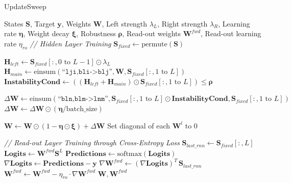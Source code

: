 \documentclass[a4paper,12pt]{report}
\begin{document}
\begin{algorithm}
\caption{UpdateSweep}
\label{alg:training_pass}
\begin{algorithmic}[1]
\scriptsize
\Require States $\mathbf{S}$, Target $\mathbf{y}$, Weights $\mathbf{W}$, 
Left strength $\lambda_{L}$, Right strength $\lambda_{R}$, Learning rate 
$\mathbf{\eta}$, Weight decay $\mathbf{\xi}$, Robustness $\mathbf{\rho}$, 
Read-out weights $\mathbf{W}^{fwd}$, Read-out learning rate 
$\eta_{ro}$
\Statex
\Statex \textit{// Hidden Layer Training}
\State $\mathbf{S}_{fixed} \gets \text{permute}(\mathbf{S})$ 

\State $\mathbf{H}_{left} \gets \mathbf{S}_{fixed}[:, 0 \text{ to } L-1] \odot \lambda_{L}$
\State $\mathbf{H}_{main} \gets \text{einsum}(\texttt{``lji,bli->blj''}, \mathbf{W}, \mathbf{S}_{fixed}[:, 1 \text{ to } L])$
\State $\mathbf{InstabilityCond} \gets ((\mathbf{H}_{left} + \mathbf{H}_{main}) \odot \mathbf{S}_{fixed}[:, 1 \text{ to } L]) \le \mathbf{\rho}$ 

\State $\Delta\mathbf{W} \gets \text{einsum}(\texttt{``bln,blm->lnm''}, \mathbf{S}_{fixed}[:, 1 \text{ to } L] \odot \mathbf{InstabilityCond}, \mathbf{S}_{fixed}[:, 1 \text{ to } L])$
\State $\Delta\mathbf{W} \gets \Delta\mathbf{W} \odot (\mathbf{\eta} / \text{batch\_size})$

\State $\mathbf{W} \gets \mathbf{W} \odot (1 - \mathbf{\eta} \odot \mathbf{\xi}) + \Delta\mathbf{W}$ 
\State Set diagonal of each $\mathbf{W}^l$ to $0$ 

\Statex
\Statex \textit{// Read-out Layer Training through Cross-Entropy Loss}
\State $\mathbf{S}_{last\_rnn} \gets \mathbf{S}_{fixed}[:, L]$
\State $\mathbf{Logits} \gets \mathbf{W}^{fwd} \mathbf{S}^{L}$
\State $\mathbf{Predictions} \gets \text{softmax}(\mathbf{Logits})$
\State $\nabla{\mathbf{Logits}} \gets \mathbf{Predictions} - \mathbf{y}$
\State $\nabla{\mathbf{W}^{fwd}} \gets (\nabla{\mathbf{Logits}})^T \, \mathbf{S}_{last\_rnn}$
\State $\mathbf{W}^{fwd} \gets \mathbf{W}^{fwd} - \eta_{ro} \cdot \nabla{\mathbf{W}^{fwd}}$
\Statex
\State \Return $\mathbf{W}, \mathbf{W}^{fwd}$
\end{algorithmic}
\end{algorithm}
\end{document}
